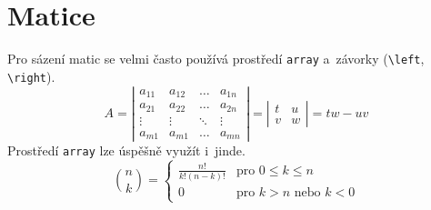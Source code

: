 \documentclass[twocolumn, a4paper, 11pt]{article}
\begin{document}
    

\section{Matice}
Pro sázení matic se velmi často používá prostředí \texttt{array} a~závorky (\verb|\left|, \verb|\right|). 
    $$ A = \left| \begin{array}{cccc}
    a_{11} & a_{12} & \ldots & a_{1n} \\
    a_{21} & a_{22} & \ldots & a_{2n} \\
    \vdots & \vdots & \ddots & \vdots \\
    a_{m1} & a_{m1} & \ldots & a_{mn} 
    \end{array} \right| 
    = \left| \begin{array}{cc}
    t & u \\
    v & w
    \end{array} \right|
    = tw - uv $$
Prostředí \texttt{array} lze úspěšně využít i~jinde.
    $$\binom{n}{k}
    = \left\{ \begin{array}{cl}
    \frac{n!}{k!(n-k)!} & \text{pro } 0 \leq k \leq n \\
    0 & \text{pro } k > n \text{ nebo } k < 0
    \end{array} \right.
    $$



    
\end{document}
